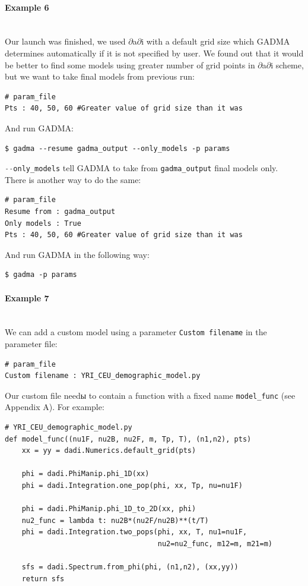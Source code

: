 \documentclass[12pt]{article}
\makeatletter
\newcommand{\dadi}{$\partial$a$\partial$i\xspace}
\newcommand{\py}[1]{\lstinline[language=Python, showstringspaces=False]@#1@}
\makeatother
\begin{document}
\paragraph{Example 6}\mbox{}\\
Our launch was finished, we used \dadi with a default grid size which GADMA determines automatically if it is not specified by user. We found out that it would be better to find some models using greater number of grid points in \dadi scheme, but we want to take final models from previous run:

\begin{lstlisting}
# param_file
Pts : 40, 50, 60 #Greater value of grid size than it was
\end{lstlisting}

And run GADMA:
\begin{lstlisting}
$ gadma --resume gadma_output --only_models -p params 
\end{lstlisting}

\py{--only_models} tell GADMA to take from \py{gadma_output} final models only. \\

There is another way to do the same:
\begin{lstlisting}
# param_file
Resume from : gadma_output
Only models : True
Pts : 40, 50, 60 #Greater value of grid size than it was
\end{lstlisting}

And run GADMA in the following way:
\begin{lstlisting}
$ gadma -p params
\end{lstlisting}

\paragraph{Example 7}\mbox{}\\
We can add a custom model using a parameter \py{Custom filename} in the parameter file:

\begin{lstlisting}
# param_file
Custom filename : YRI_CEU_demographic_model.py
\end{lstlisting}

Our custom file needы to contain a function with a fixed name \py{model_func} (see Appendix A). For example:

\begin{lstlisting}
# YRI_CEU_demographic_model.py
def model_func((nu1F, nu2B, nu2F, m, Tp, T), (n1,n2), pts)
    xx = yy = dadi.Numerics.default_grid(pts)

    phi = dadi.PhiManip.phi_1D(xx)
    phi = dadi.Integration.one_pop(phi, xx, Tp, nu=nu1F)

    phi = dadi.PhiManip.phi_1D_to_2D(xx, phi)
    nu2_func = lambda t: nu2B*(nu2F/nu2B)**(t/T)
    phi = dadi.Integration.two_pops(phi, xx, T, nu1=nu1F, 
                                    nu2=nu2_func, m12=m, m21=m)

    sfs = dadi.Spectrum.from_phi(phi, (n1,n2), (xx,yy))
    return sfs
\end{lstlisting}
\end{document}
